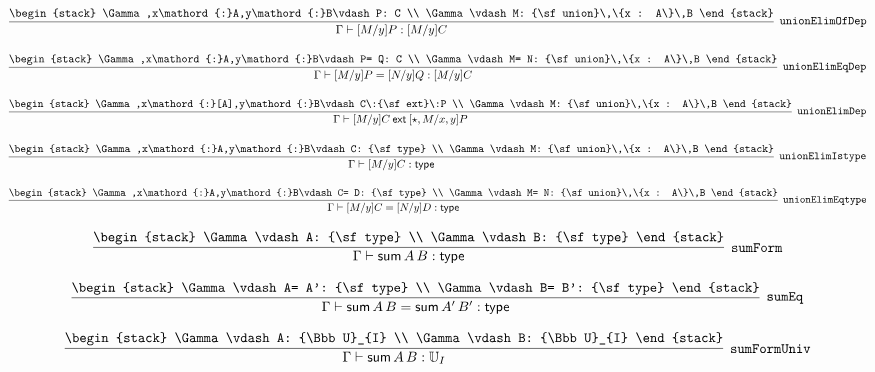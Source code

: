 \[
\infer[{\tt unionElimOfDep}]{\Gamma \vdash [M/y]P: [M/y]C}{
\begin{stack}
\Gamma ,x\mathord{:}A,y\mathord{:}B\vdash P: C
\\
\Gamma \vdash M: {\sf union}\,\{x : A\}\,B
\end{stack}}
\]

\[
\infer[{\tt unionElimEqDep}]{\Gamma \vdash [M/y]P= [N/y]Q: [M/y]C}{
\begin{stack}
\Gamma ,x\mathord{:}A,y\mathord{:}B\vdash P= Q: C
\\
\Gamma \vdash M= N: {\sf union}\,\{x : A\}\,B
\end{stack}}
\]

\[
\infer[{\tt unionElimDep}]{\Gamma \vdash [M/y]C\:{\sf ext}\:[\star , M/x, y]P}{
\begin{stack}
\Gamma ,x\mathord{:}[A],y\mathord{:}B\vdash C\:{\sf ext}\:P
\\
\Gamma \vdash M: {\sf union}\,\{x : A\}\,B
\end{stack}}
\]

\[
\infer[{\tt unionElimIstype}]{\Gamma \vdash [M/y]C: {\sf type}}{
\begin{stack}
\Gamma ,x\mathord{:}A,y\mathord{:}B\vdash C: {\sf type}
\\
\Gamma \vdash M: {\sf union}\,\{x : A\}\,B
\end{stack}}
\]

\[
\infer[{\tt unionElimEqtype}]{\Gamma \vdash [M/y]C= [N/y]D: {\sf type}}{
\begin{stack}
\Gamma ,x\mathord{:}A,y\mathord{:}B\vdash C= D: {\sf type}
\\
\Gamma \vdash M= N: {\sf union}\,\{x : A\}\,B
\end{stack}}
\]

\[
\infer[{\tt sumForm}]{\Gamma \vdash {\sf sum}\,A\,B: {\sf type}}{
\begin{stack}
\Gamma \vdash A: {\sf type}
\\
\Gamma \vdash B: {\sf type}
\end{stack}}
\]

\[
\infer[{\tt sumEq}]{\Gamma \vdash {\sf sum}\,A\,B= {\sf sum}\,A'\,B': {\sf type}}{
\begin{stack}
\Gamma \vdash A= A': {\sf type}
\\
\Gamma \vdash B= B': {\sf type}
\end{stack}}
\]

\[
\infer[{\tt sumFormUniv}]{\Gamma \vdash {\sf sum}\,A\,B: {\Bbb U}_{I}}{
\begin{stack}
\Gamma \vdash A: {\Bbb U}_{I}
\\
\Gamma \vdash B: {\Bbb U}_{I}
\end{stack}}
\]

